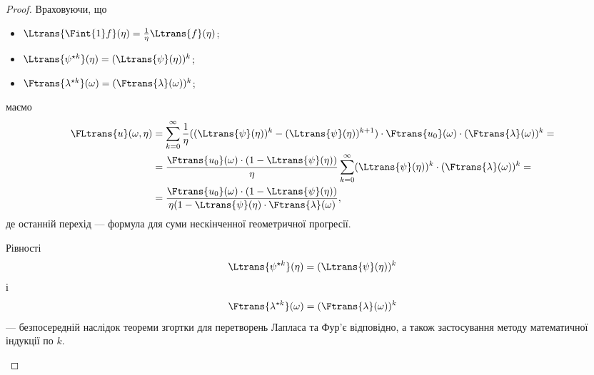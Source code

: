 \begin{proof}
    Враховуючи, що
    \begin{itemize}
        \item $\Ltrans{\Fint{1} f}(\eta) = \frac{1}{\eta} \Ltrans{f}(\eta)$;
        \item $\Ltrans{\psi^{\star k}}(\eta) = (\Ltrans{\psi}(\eta))^k$;
        \item $\Ftrans{\lambda^{\star k}}(\omega) = (\Ftrans{\lambda}(\omega))^k$;
    \end{itemize}
    маємо
    \begin{equation}
        \begin{aligned}
            \FLtrans{u}(\omega, \eta) 
            &= \sum_{k = 0}^\infty \frac{1}{\eta} ((\Ltrans{\psi}(\eta))^k - (\Ltrans{\psi}(\eta))^{k + 1}) \cdot \Ftrans{u_0}(\omega) \cdot (\Ftrans{\lambda}(\omega))^k = \\
            &= \frac{\Ftrans{u_0}(\omega) \cdot (1 - \Ltrans{\psi}(\eta))}{\eta} \sum_{k = 0}^\infty (\Ltrans{\psi}(\eta))^k \cdot (\Ftrans{\lambda}(\omega))^k = \\
            &= \frac{\Ftrans{u_0}(\omega) \cdot (1 - \Ltrans{\psi}(\eta))}{\eta (1 - \Ltrans{\psi}(\eta) \cdot \Ftrans{\lambda}(\omega)},
        \end{aligned}
    \end{equation}
    де останній перехід --- формула для суми нескінченної геометричної прогресії.
    
    \begin{remark}
        Рівності
        \begin{equation}
            \Ltrans{\psi^{\star k}}(\eta) = (\Ltrans{\psi}(\eta))^k
        \end{equation}
        і
        \begin{equation}
            \Ftrans{\lambda^{\star k}}(\omega) = (\Ftrans{\lambda}(\omega))^k
        \end{equation}
        --- безпосередній наслідок теореми згортки для перетворень Лапласа та Фур'є відповідно, а також застосування методу математичної індукції по $k$.
    \end{remark}
\end{proof}
